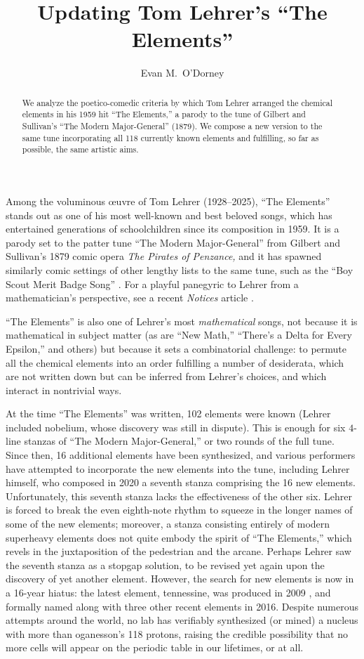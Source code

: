 \documentclass{article}
\title{Updating Tom Lehrer's ``The Elements''}
\author{Evan M.\ O'Dorney}
\begin{document}
\maketitle

\begin{abstract}
  We analyze the poetico-comedic criteria by which Tom Lehrer arranged the chemical elements in his 1959 hit ``The Elements,'' a parody to the tune of Gilbert and Sullivan's ``The Modern Major-General'' (1879). We compose a new version to the same tune incorporating all 118 currently known elements and fulfilling, so far as possible, the same artistic aims.
\end{abstract}

Among the voluminous {\oe}uvre of Tom Lehrer (1928--2025), ``The Elements'' stands out as one of his most well-known and best beloved songs, which has entertained generations of schoolchildren since its composition in 1959. It is a parody set to the patter tune ``The Modern Major-General'' from Gilbert and Sullivan's 1879 comic opera \emph{The Pirates of Penzance,} and it has spawned similarly comic settings of other lengthy lists to the same tune, such as the ``Boy Scout Merit Badge Song'' \citep{BoyScout}. For a playful panegyric to Lehrer from a mathematician's perspective, see a recent \emph{Notices} article \citep{Courant_Lehrer}.

``The Elements'' is also one of Lehrer's most \emph{mathematical} songs, not because it is mathematical in subject matter (as are ``New Math,'' ``There’s a Delta for Every Epsilon,'' and others) but because it sets a combinatorial challenge: to permute all the chemical elements into an order fulfilling a number of desiderata, which are not written down but can be inferred from Lehrer's choices, and which interact in nontrivial ways.

At the time ``The Elements'' was written, 102 elements were known (Lehrer included nobelium, whose discovery was still in dispute). This is enough for six $4$-line stanzas of ``The Modern Major-General,'' or two rounds of the full tune. Since then, 16 additional elements have been synthesized, and various performers have attempted to incorporate the new elements into the tune, including Lehrer himself, who composed in 2020 a seventh stanza comprising the 16 new elements. Unfortunately, this seventh stanza lacks the effectiveness of the other six. Lehrer is forced to break the even eighth-note rhythm to squeeze in the longer names of some of the new elements; moreover, a stanza consisting entirely of modern superheavy elements does not quite embody the spirit of ``The Elements,'' which revels in the juxtaposition of the pedestrian and the arcane. Perhaps Lehrer saw the seventh stanza as a stopgap solution, to be revised yet again upon the discovery of yet another element. However, the search for new elements is now in a 16-year hiatus: the latest element, tennessine, was produced in 2009 \citep{ListByDiscovery,Tennessine}, and formally named along with three other recent elements in 2016. Despite numerous attempts around the world, no lab has verifiably synthesized (or mined) a nucleus with more than oganesson's 118 protons, raising the credible possibility that no more cells will appear on the periodic table in our lifetimes, or at all.
\end{document}
